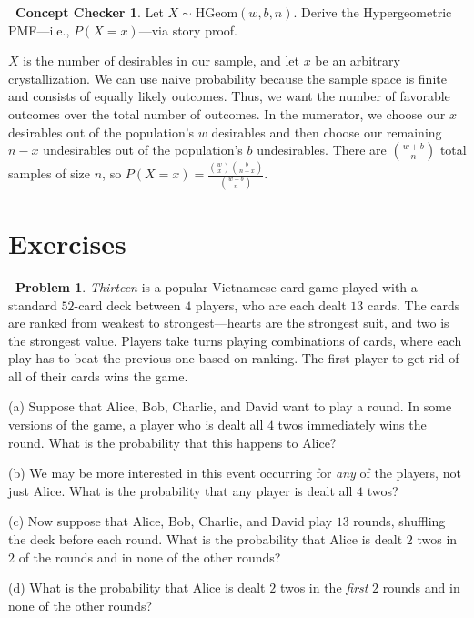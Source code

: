 \documentclass[12pt,oneside]{article}
\newcommand{\HGeom}{\text{HGeom}}
\theoremstyle{definition}
\newtheorem{problem}{\faPen \ Problem}
\newtheorem{concept}{\faPen \ Concept Checker}
\theoremstyle{remark}
\begin{document}
\begin{concept}
Let $X \sim \HGeom(w, b, n)$. Derive the Hypergeometric PMF—i.e., $P(X = x)$—via story proof.
\end{concept}

\begin{solutionbox}
$X$ is the number of desirables in our sample, and let $x$ be an arbitrary crystallization. We can use naive probability because the sample space is finite and consists of equally likely outcomes. Thus, we want the number of favorable outcomes over the total number of outcomes. In the numerator, we choose our $x$ desirables out of the population's $w$ desirables and then choose our remaining $n - x$ undesirables out of the population's $b$ undesirables. There are $\binom{w + b}{n}$ total samples of size $n$, so $P(X = x) = \frac{\binom{w}{x}\binom{b}{n-x}}{\binom{w+b}{n}}$.
\end{solutionbox}

\section{Exercises}

\begin{problem}
\textit{Thirteen} is a popular Vietnamese card game played with a standard $52$-card deck between $4$ players, who are each dealt $13$ cards. The cards are ranked from weakest to strongest—hearts are the strongest suit, and two is the strongest value. Players take turns playing combinations of cards, where each play has to beat the previous one based on ranking. The first player to get rid of all of their cards wins the game.

(a) Suppose that Alice, Bob, Charlie, and David want to play a round. In some versions of the game, a player who is dealt all $4$ twos immediately wins the round. What is the probability that this happens to Alice?

(b) We may be more interested in this event occurring for \textit{any} of the players, not just Alice. What is the probability that any player is dealt all $4$ twos?

(c) Now suppose that Alice, Bob, Charlie, and David play $13$ rounds, shuffling the deck before each round. What is the probability that Alice is dealt $2$ twos in $2$ of the rounds and in none of the other rounds?

(d) What is the probability that Alice is dealt $2$ twos in the \textit{first} $2$ rounds and in none of the other rounds?
\end{problem}
\end{document}
